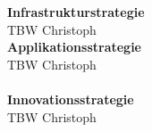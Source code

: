 \textbf{Infrastrukturstrategie}\\
TBW Christoph\\

\textbf{Applikationsstrategie}\\
TBW Christoph\\\\

\textbf{Innovationsstrategie}\\
TBW Christoph\\\\